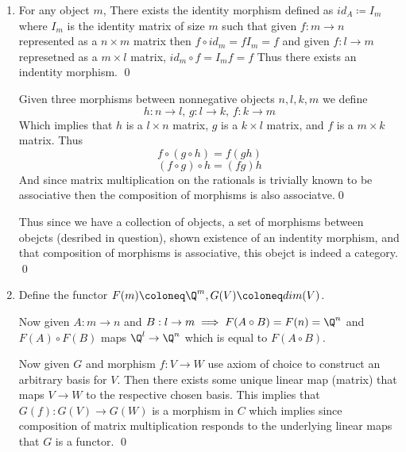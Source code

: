 \documentclass[12pt]{amsart}
\begin{document}
  \newpage
  \begin{problem}
  \begin{enumerate}
  \item  
  \begin{claim}
    For any object $m$, There exists the identity morphism defined as $id_A \coloneq I_m$ where $I_m$ is the identity matrix of size $m$ such that given $f: m\to n$ represented as a $n\times m$ matrix then $f \circ id_m = fI_m = f$ and given $f: l\to m$ represetned as a $m\times l$ matrix, $id_m \circ f = I_m f = f$ Thus there exists an indentity morphism. \qed
  \end{claim}
  \begin{claim}
    Given three morphisms between nonnegative objects $n, l, k, m$ we define 
    \[h:n\to l,\, g:l\to k,\, f:k\to m\]
    Which implies that $h$ is a $l\times n$ matrix, $g$ is a $k \times l$ matrix, and $f$ is a $m\times k$ matrix. Thus 
    \[f\circ (g\circ h) = f(gh)\]
    \[(f\circ g)\circ h = (fg)h\] 
    And since matrix multiplication on the rationals is trivially known to be associative then the composition of morphisms is also associatve.\qed
  \end{claim}
  Thus since we have a collection of objects, a set of morphisms between obejcts (desribed in question), shown existence of an indentity morphism, and that composition of morphisms is associative, this obejct is indeed a category. \qed 
    \item 
      Define the functor $F(m)\coloneq \Q^m, G(V)\coloneq dim(V)$. 

      Now given $A: m\to n$ and $B: l\to m\implies F(A\circ B) = F(n)= \Q^n$ and $F(A)\circ F(B)$ maps $\Q^l\to \Q^n$ which is equal to $F(A\circ B)$. 

      Now given $G$ and morphism $f: V\to W$ use axiom of choice to construct an arbitrary basis for $V$. Then there exists some unique linear map (matrix) that maps $V\to W$ to the respective chosen basis. This implies that $G(f): G(V)\to G(W)$ is a morphism in $C$ which implies since composition of matrix multiplication responds to the underlying linear maps that $G$ is a functor. \qed 

  \end{enumerate}
  \end{problem}
\end{document}
